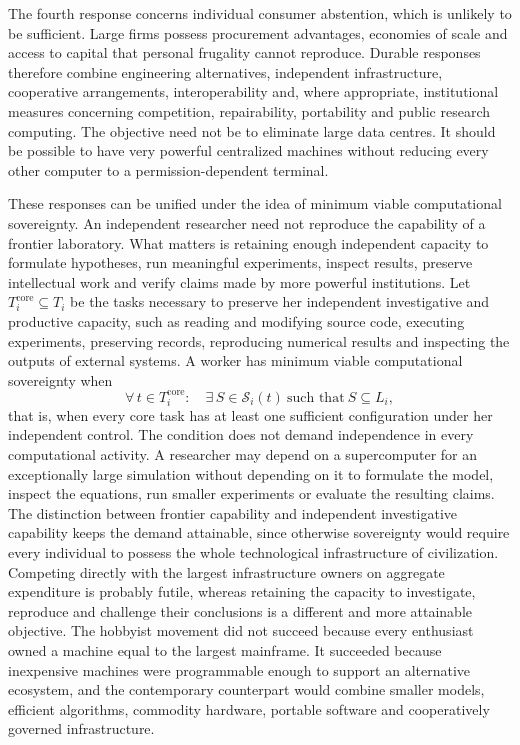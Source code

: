 \documentclass[11pt]{article}
\theoremstyle{plain}
\theoremstyle{definition}
\begin{document}
The fourth response concerns individual consumer abstention, which is unlikely to be sufficient. Large firms possess procurement advantages, economies of scale and access to capital that personal frugality cannot reproduce. Durable responses therefore combine engineering alternatives, independent infrastructure, cooperative arrangements, interoperability and, where appropriate, institutional measures concerning competition, repairability, portability and public research computing. The objective need not be to eliminate large data centres. It should be possible to have very powerful centralized machines without reducing every other computer to a permission-dependent terminal.

These responses can be unified under the idea of minimum viable computational sovereignty. An independent researcher need not reproduce the capability of a frontier laboratory. What matters is retaining enough independent capacity to formulate hypotheses, run meaningful experiments, inspect results, preserve intellectual work and verify claims made by more powerful institutions. Let $T_i^{\mathrm{core}}\subseteq T_i$ be the tasks necessary to preserve her independent investigative and productive capacity, such as reading and modifying source code, executing experiments, preserving records, reproducing numerical results and inspecting the outputs of external systems. A worker has minimum viable computational sovereignty when
\[
\forall\, t\in T_i^{\mathrm{core}}:\quad \exists\, S\in\mathcal{S}_i(t)\ \text{such that}\ S\subseteq L_i,
\]
that is, when every core task has at least one sufficient configuration under her independent control. The condition does not demand independence in every computational activity. A researcher may depend on a supercomputer for an exceptionally large simulation without depending on it to formulate the model, inspect the equations, run smaller experiments or evaluate the resulting claims. The distinction between frontier capability and independent investigative capability keeps the demand attainable, since otherwise sovereignty would require every individual to possess the whole technological infrastructure of civilization. Competing directly with the largest infrastructure owners on aggregate expenditure is probably futile, whereas retaining the capacity to investigate, reproduce and challenge their conclusions is a different and more attainable objective. The hobbyist movement did not succeed because every enthusiast owned a machine equal to the largest mainframe. It succeeded because inexpensive machines were programmable enough to support an alternative ecosystem, and the contemporary counterpart would combine smaller models, efficient algorithms, commodity hardware, portable software and cooperatively governed infrastructure.
\end{document}
